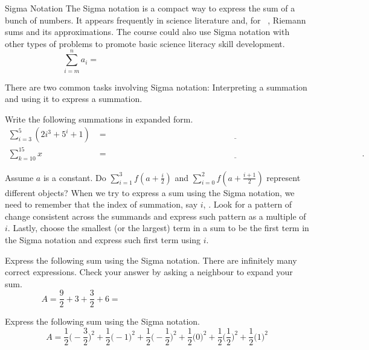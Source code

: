 \documentclass[../main.tex]{subfiles}
\begin{document}
\begin{lesson}{Sigma Notation}
  The Sigma notation is a compact way to express the sum of a bunch of numbers. It appears frequently in science literature and, for \thecoursesubject~\thecoursenumb, Riemann sums and its approximations. The course could also use Sigma notation with other types of problems to promote basic science literacy skill development.
  {\huge \[ \sum_{i=m}^{n} a_{i} = \hspace{3in}\]}

  There are two common tasks involving Sigma notation: Interpreting a summation and using it to express a summation.
  \begin{example} \label{ex:sigma-notation-read)}
    Write the following summations in expanded form.
    \begin{align*}
      \sum_{i=3}^{5} (2i^{3} + 5^{i} + 1)
      &= \underline{\hspace{5in}} \\[3ex]
      \sum_{k=10}^{15} x
      &= \underline{\hspace{5in}}.
    \end{align*}
  \end{example}
  \faComment{} Assume \(a\) is a constant. Do \(\sum_{i=1}^{3}f\left(a + \frac{i}{2}\right)\) and \(\sum_{i=0}^{2}f\left(a + \frac{i+1}{2}\right)\) represent different objects? 
  \clearpage
  When we try to express a sum using the Sigma notation, we need to remember that the index of summation, say \(i\), . Look for a pattern of change consistent across the summands and express such pattern as a multiple of \(i\).  Lastly, choose the smallest (or the largest) term in a sum to be the first term in the Sigma notation and express such first term using \(i\).

  \begin{example}
    Express the following sum using the Sigma notation. There are infinitely many correct expressions. Check your answer by asking a neighbour to expand your sum.
    \[
      A = \frac{9}{2} + 3 + \frac{3}{2} + 6 = \hspace{3in}
    \]
  \end{example}

  \begin{example}
    Express the following sum using the Sigma notation. 
    \[
      A = \frac{1}{2} \bigg( -\frac{3}{2} \bigg)^{2} + \frac{1}{2} \bigg( -1 \bigg)^{2} + \frac{1}{2} \bigg( -\frac{1}{2} \bigg)^{2} + \frac{1}{2} \bigg( 0 \bigg)^{2} + \frac{1}{2} \bigg( \frac{1}{2} \bigg)^{2} + \frac{1}{2} \bigg( 1 \bigg)^{2}
    \]
  \end{example}
  \vfill


\end{lesson}
\end{document}
